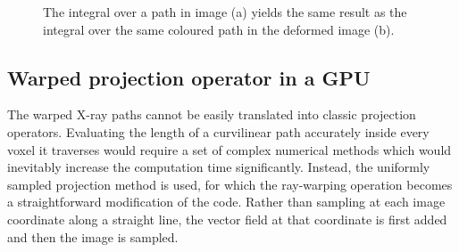 \begin{figure}
\begin{center} 
\caption{\label{fig:motion} The integral over a path in image (a) yields the same result as the integral over the same coloured path in the deformed image (b).} 
\end{center} 
\end{figure}



\subsection{Warped projection operator in a GPU}

The warped X-ray paths cannot be easily translated into classic projection operators.  Evaluating the length of a curvilinear path accurately inside every voxel it traverses would require a set of complex numerical methods which would inevitably increase the computation time significantly.  Instead, the uniformly sampled projection method is used, for which the ray-warping operation becomes a straightforward modification of the code.  Rather than sampling at each image coordinate along a straight line, the vector field at that coordinate is first added and then the image is sampled.
 
